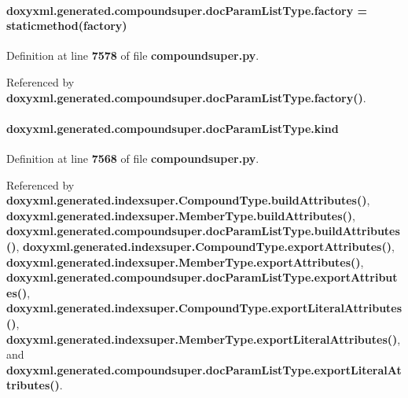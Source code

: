 \paragraph[{factory}]{\setlength{\rightskip}{0pt plus 5cm}doxyxml.\+generated.\+compoundsuper.\+doc\+Param\+List\+Type.\+factory = staticmethod(factory)\hspace{0.3cm}{\ttfamily [static]}}\label{classdoxyxml_1_1generated_1_1compoundsuper_1_1docParamListType_a8d8b43dd0572a95f479533f40cddfe56}


Definition at line {\bf 7578} of file {\bf compoundsuper.\+py}.



Referenced by {\bf doxyxml.\+generated.\+compoundsuper.\+doc\+Param\+List\+Type.\+factory()}.

\paragraph[{kind}]{\setlength{\rightskip}{0pt plus 5cm}doxyxml.\+generated.\+compoundsuper.\+doc\+Param\+List\+Type.\+kind}\label{classdoxyxml_1_1generated_1_1compoundsuper_1_1docParamListType_a5825f589db4c922296f307b5d85d556d}


Definition at line {\bf 7568} of file {\bf compoundsuper.\+py}.



Referenced by {\bf doxyxml.\+generated.\+indexsuper.\+Compound\+Type.\+build\+Attributes()}, {\bf doxyxml.\+generated.\+indexsuper.\+Member\+Type.\+build\+Attributes()}, {\bf doxyxml.\+generated.\+compoundsuper.\+doc\+Param\+List\+Type.\+build\+Attributes()}, {\bf doxyxml.\+generated.\+indexsuper.\+Compound\+Type.\+export\+Attributes()}, {\bf doxyxml.\+generated.\+indexsuper.\+Member\+Type.\+export\+Attributes()}, {\bf doxyxml.\+generated.\+compoundsuper.\+doc\+Param\+List\+Type.\+export\+Attributes()}, {\bf doxyxml.\+generated.\+indexsuper.\+Compound\+Type.\+export\+Literal\+Attributes()}, {\bf doxyxml.\+generated.\+indexsuper.\+Member\+Type.\+export\+Literal\+Attributes()}, and {\bf doxyxml.\+generated.\+compoundsuper.\+doc\+Param\+List\+Type.\+export\+Literal\+Attributes()}.

